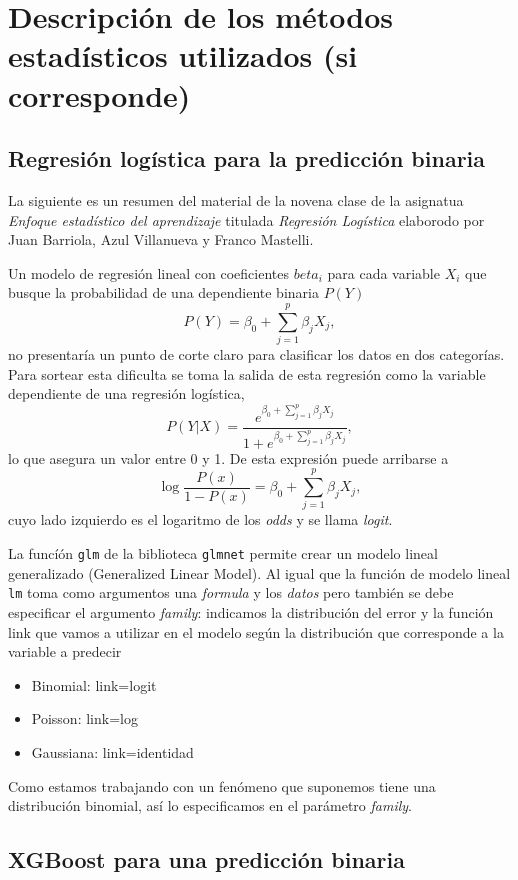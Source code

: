 \documentclass[a4paper]{report}
\begin{document}
\section{Descripción de los métodos estadísticos utilizados (si corresponde)}

\subsection{Regresión logística para la predicción binaria}

La siguiente es un resumen del material de la novena clase de la asignatua \emph{Enfoque estadístico del aprendizaje} titulada 
\emph{Regresión Logística} elaborodo por Juan Barriola, Azul Villanueva y Franco Mastelli. 

Un modelo de regresión lineal con coeficientes \(beta_i\) para cada variable \(X_i\) que busque la probabilidad de una dependiente binaria \(P(Y)\)  
\[
P(Y) = \beta_0 + \sum\limits_{j=1}^p \beta_j X_j,	
\]
no presentaría un punto de corte claro para clasificar los datos en dos categorías.
Para sortear esta dificulta se toma la salida de esta regresión como la variable dependiente de una regresión logística,
\[
P(Y|X)= \frac{e^{\beta_0 + \sum\limits_{j=1}^p \beta_j X_j}}{1+e^{\beta_0 + \sum\limits_{j=1}^p \beta_j X_j}},
\]
lo que asegura un valor entre 0 y 1.
De esta expresión puede arribarse a 
\[
	\log {\frac{P(x)}{1-P(x)}}= \beta_0 + \sum\limits_{j=1}^p \beta_j X_j,
\]
cuyo lado izquierdo es el logaritmo de los \emph{odds} y se llama \emph{logit}. 

La funcíón \verb'glm' de la biblioteca \verb'glmnet' permite crear un modelo lineal generalizado (Generalized Linear Model).
Al igual que la función de modelo lineal \verb'lm' toma como argumentos una \emph{formula} y los \emph{datos} pero también se debe especificar el argumento \emph{family}: indicamos la distribución del error y la función link que vamos a utilizar en el modelo según la distribución que corresponde a la variable a predecir 
\begin{itemize}
	\item Binomial: link=logit
	\item Poisson: link=log
	\item Gaussiana: link=identidad
\end{itemize}
Como estamos trabajando con un fenómeno que suponemos tiene una distribución binomial, así lo especificamos en el parámetro \emph{family}.



\subsection{XGBoost para una predicción binaria}
\end{document}
